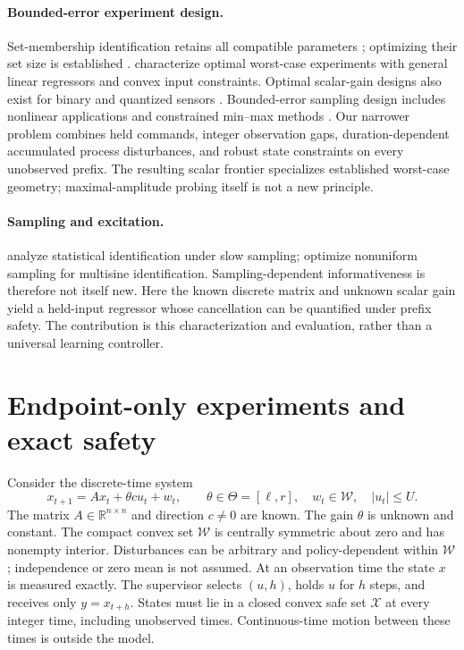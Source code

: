 \documentclass{l4dc2026}
\newcommand{\R}{\mathbb{R}}
\newcommand{\W}{\mathcal{W}}
\newcommand{\X}{\mathcal{X}}
\begin{document}
\paragraph{Bounded-error experiment design.}
Set-membership identification retains all compatible parameters \citep{kosut1992}; optimizing their set size is established \citep{pronzato1990}. \citet{tanaskovic2014} characterize optimal worst-case experiments with general linear regressors and convex input constraints. Optimal scalar-gain designs also exist for binary and quantized sensors \citep{casini2011,casini2012}. Bounded-error sampling design includes nonlinear applications \citep{marvel2012} and constrained min--max methods \citep{walz2018}. Our narrower problem combines held commands, integer observation gaps, duration-dependent accumulated process disturbances, and robust state constraints on every unobserved prefix. The resulting scalar frontier specializes established worst-case geometry; maximal-amplitude probing itself is not a new principle.

\paragraph{Sampling and excitation.}
\citet{gonzalez2024} analyze statistical identification under slow sampling; \citet{dozzi2026} optimize nonuniform sampling for multisine identification. Sampling-dependent informativeness is therefore not itself new. Here the known discrete matrix and unknown scalar gain yield a held-input regressor whose cancellation can be quantified under prefix safety. The contribution is this characterization and evaluation, rather than a universal learning controller.

\section{Endpoint-only experiments and exact safety}
Consider the discrete-time system
\begin{equation}\label{eq:model}
 x_{t+1}=Ax_t+\theta c u_t+w_t,\qquad
 \theta\in\Theta=[\ell,r],\quad w_t\in\W,\quad |u_t|\le U.
\end{equation}
The matrix $A\in\R^{n\times n}$ and direction $c\ne0$ are known. The gain $\theta$ is unknown and constant. The compact convex set $\W$ is centrally symmetric about zero and has nonempty interior. Disturbances can be arbitrary and policy-dependent within $\W$; independence or zero mean is not assumed. At an observation time the state $x$ is measured exactly. The supervisor selects $(u,h)$, holds $u$ for $h$ steps, and receives only $y=x_{t+h}$. States must lie in a closed convex safe set $\X$ at every integer time, including unobserved times. Continuous-time motion between these times is outside the model.
\end{document}
